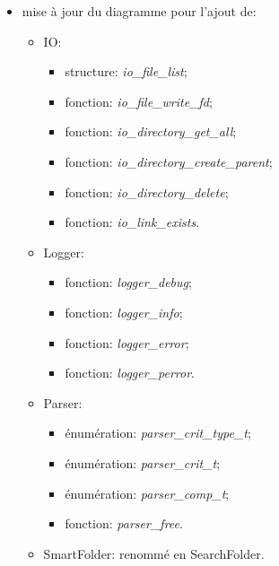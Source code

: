 \documentclass[11pt, a4paper]{article}
\begin{document}
\begin{itemize}
    \item mise à jour du diagramme pour l'ajout de:
    \begin{itemize}
        \item IO:
        \begin{itemize}
            \item structure: \textit{io\_file\_list};
            \item fonction: \textit{io\_file\_write\_fd};
            \item fonction: \textit{io\_directory\_get\_all};
            \item fonction: \textit{io\_directory\_create\_parent};
            \item fonction: \textit{io\_directory\_delete};
            \item fonction: \textit{io\_link\_exists}.
        \end{itemize}
    \end{itemize}
    \begin{itemize}
        \item Logger:
        \begin{itemize}
            \item fonction: \textit{logger\_debug};
            \item fonction: \textit{logger\_info};
            \item fonction: \textit{logger\_error};
            \item fonction: \textit{logger\_perror}.
        \end{itemize}
    \end{itemize}
    \begin{itemize}
        \item Parser:
        \begin{itemize}
            \item énumération: \textit{parser\_crit\_type\_t};
            \item énumération: \textit{parser\_crit\_t};
            \item énumération: \textit{parser\_comp\_t};
            \item fonction: \textit{parser\_free}.
        \end{itemize}
    \end{itemize}
    \begin{itemize}
        \item SmartFolder: renommé en SearchFolder.
    \end{itemize}
\end{itemize}
\end{document}
